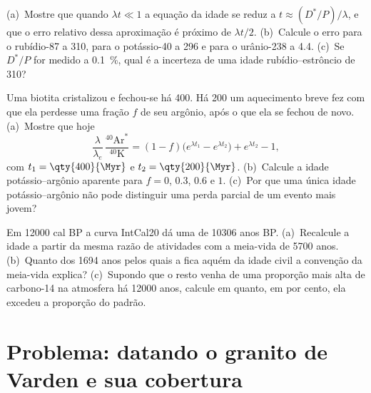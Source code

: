 \begin{exercise}[$\star\star\star$]\label{exo:b1:radiometric-methods:10}
(a)~Mostre que quando $\lambda t \ll 1$ a equação da idade se reduz a $t \approx
(D^*/P)/\lambda$, e que o erro relativo dessa aproximação é próximo de
$\lambda t/2$. (b)~Calcule o erro para o rubídio-87 a \qty{310}{\Ma}, para o potássio-40 a
\qty{296}{\Ma} e para o urânio-238 a \qty{4.4}{\Ga}. (c)~Se $D^*/P$ for medido a
\qty{0.1}{\percent}, qual é a incerteza de uma idade rubídio--estrôncio de \qty{310}{\Ma}?
\end{exercise}

\begin{exercise}[$\star\star\star$]\label{exo:b1:radiometric-methods:11}
Uma biotita cristalizou e fechou-se há \qty{400}{\Myr}. Há \qty{200}{\Myr} um aquecimento breve
fez com que ela perdesse uma fração $f$ de seu argônio, após o que ela se fechou de novo.
(a)~Mostre que hoje
\[
  \frac{\lambda}{\lambda_e}\,\frac{^{40}\mathrm{Ar}^*}{^{40}\mathrm{K}} =
  (1 - f)\bigl(e^{\lambda t_1} - e^{\lambda t_2}\bigr) + e^{\lambda t_2} - 1,
\]
com $t_1 = \qty{400}{\Myr}$ e $t_2 = \qty{200}{\Myr}$. (b)~Calcule a idade potássio--argônio
aparente para $f = 0$, $0.3$, $0.6$ e $1$. (c)~Por que uma única idade potássio--argônio não pode
distinguir uma perda parcial de um evento mais jovem?
\end{exercise}

\begin{exercise}[$\star\star\star$]\label{exo:b1:radiometric-methods:12}
Em \num{12000} cal BP a curva IntCal20 dá uma  de \num{10306} anos BP. (a)~Recalcule
a idade a partir da mesma razão de atividades com a meia-vida de \num{5700} anos. (b)~Quanto dos
\num{1694} anos pelos quais a  fica aquém da idade civil a convenção da
meia-vida explica? (c)~Supondo que o resto venha de uma proporção mais alta de carbono-14 na
atmosfera há \num{12000} anos, calcule em quanto, em por cento, ela excedeu a proporção do padrão.
\end{exercise}

\section{Problema: datando o granito de Varden e sua cobertura}

